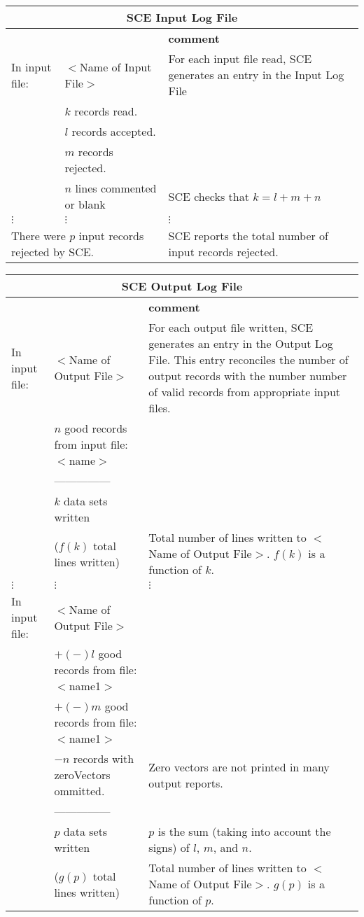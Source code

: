 \vspace{.5in}
\begin{tabular}{llp{4in}}
\multicolumn{3}{c}{{\bf SCE Input Log File}}\\ \hline\hline
&  &   {\bf comment} \\ \hline
In input file: & $<$Name of Input File$>$ & For each input file read, SCE generates
   an entry in the Input Log File\\
& $k$ records read. \\
& $l$ records accepted. \\
& $m$ records rejected.\\
& $n$ lines commented or blank & SCE checks that $k = l + m + n$\\
$\vdots $ & $\vdots $ & $\vdots$ \\
\multicolumn{2}{l}{There were $p$ input records rejected by SCE.} & SCE reports the
total number of input records rejected.

\end{tabular}

\vspace{.5in}
\begin{tabular}{llp{3in}}
\multicolumn{3}{c}{{\bf SCE Output Log File}}\\ \hline\hline
&  &   {\bf comment} \\ \hline
In input file: & $<$Name of Output File$>$ & For each output file written, 
                 SCE generates an entry in the Output Log File.  This entry
                 reconciles the number of output records with the number
                 number of valid records from appropriate input files.\\
& $n$ good records from input file: $<$name$>$ \\
& --------------- & \\
& $k$ data sets written & \\
& ($f(k)$ total lines written) & Total number of lines written to $<$Name of Output File$>$.  $f(k)$ is a function of $k$. \\
$\vdots $ & $\vdots $ & $\vdots$ \\
In input file: & $<$Name of Output File$>$ & \\
& $+(-) l$ good records from file: $<$name1$>$ & \\
& $+(-) m$ good records from file: $<$name1$>$ & \\
& $- n$ records with zeroVectors ommitted. & Zero vectors are not printed in many
            output reports. \\
& --------------- & \\
& $p$ data sets written & $p$ is the sum (taking into account the signs) of $l$, $m$,
    and $n$. \\
& ($g(p)$ total lines written) & Total number of lines written to $<$Name of Output File$>$.  $g(p)$ is a function of $p$.
\end{tabular}


